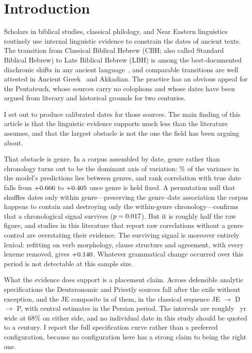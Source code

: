 \documentclass[10pt,letterpaper]{article}
\newcommand{\cbh}{CBH}
\newcommand{\lbh}{LBH}
\begin{document}
\clearpage
{}
\linenumbers

\section*{Introduction}

Scholars in biblical studies, classical philology, and Near Eastern
linguistics routinely use internal linguistic evidence to constrain the dates
of ancient texts.  The transition from Classical Biblical Hebrew (\cbh{}; also
called Standard Biblical Hebrew) to Late Biblical Hebrew (\lbh{}) is among the
best-documented diachronic shifts in any ancient
language~\cite{Hurvitz1982,Rooker1990,Polzin1976}, and comparable transitions
are well attested in Ancient Greek~\cite{Horrocks2010} and Akkadian.  The
practice has an obvious appeal for the Pentateuch, whose sources carry no
colophons and whose dates have been argued from literary and historical
grounds for two centuries.

I set out to produce calibrated dates for those sources.  The main finding of
this article is that the linguistic evidence supports much less than the
literature assumes, and that the largest obstacle is not the one the field has
been arguing about.

That obstacle is genre.  In a corpus assembled by date, genre rather than
chronology turns out to be the dominant axis of variation: \GNbetween\% of the
variance in the model's predictions lies between genres, and rank correlation
with true date falls from $+0.666$ to $+0.405$ once genre is held
fixed.  A permutation null that shuffles dates only within genre---preserving
the genre--date association the corpus happens to contain and destroying only
the within-genre chronology---confirms that a chronological signal survives ($p
= 0.017$).  But it is roughly half the raw figure, and studies in this
literature that report raw correlations without a genre control are overstating
their evidence.  The surviving signal is moreover entirely lexical: refitting on
verb morphology, clause structure and agreement, with every lexeme removed,
gives $+0.140$.  Whatever grammatical change occurred over this period is
not detectable at this sample size.

What the evidence does support is a placement claim.  Across \SPpass{}
defensible analytic specifications the Deuteronomic and Priestly sources fall
after the exile without exception, and the JE composite in \SPJEpost{} of them,
in the classical sequence JE $\rightarrow$ D $\rightarrow$ P, with central
estimates in the Persian period.  The intervals are roughly \SPPhalf~yr wide at
68\% on either side, and no individual date in this study should be quoted to a
century.  I report the full specification curve rather than a preferred
configuration, because no configuration here has a strong claim to being the
right one.
\end{document}
